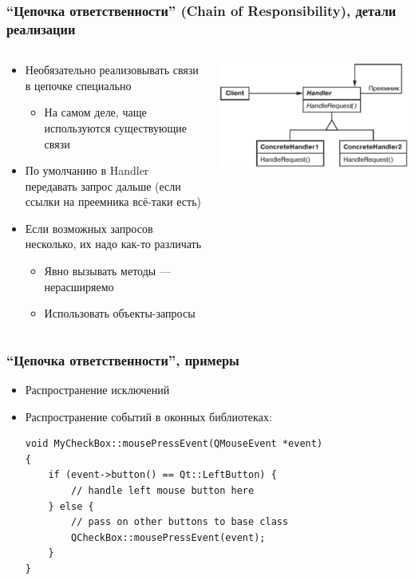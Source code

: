 \documentclass[xetex,mathserif,serif]{beamer}
\begin{document}
	\begin{frame}
		\frametitle{``Цепочка ответственности'' (Chain of Responsibility), детали реализации}
		\begin{columns}
			\begin{column}{0.5\textwidth}
				\begin{itemize}
					\item Необязательно реализовывать связи в цепочке специально
					\begin{itemize}
						\item На самом деле, чаще используются существующие связи
					\end{itemize}
					\item По умолчанию в Handler передавать запрос дальше (если ссылки на преемника всё-таки есть)
					\item Если возможных запросов несколько, их надо как-то различать
					\begin{itemize}
						\item Явно вызывать методы --- нерасширяемо
						\item Использовать объекты-запросы
					\end{itemize}
				\end{itemize}
			\end{column}
			\begin{column}{0.5\textwidth}
				\begin{center}
					\includegraphics[width=\textwidth]{chainOfResponsibility.png}
				\end{center}
			\end{column}
		\end{columns}
	\end{frame}

	\begin{frame}[fragile]
		\frametitle{``Цепочка ответственности'', примеры}
		\begin{itemize}
			\item Распространение исключений
			\item Распространение событий в оконных библиотеках:
			\begin{verbatim}
void MyCheckBox::mousePressEvent(QMouseEvent *event)
{
    if (event->button() == Qt::LeftButton) {
        // handle left mouse button here
    } else {
        // pass on other buttons to base class
        QCheckBox::mousePressEvent(event);
    }
}
			\end{verbatim}
		\end{itemize}
	\end{frame}
\end{document}

